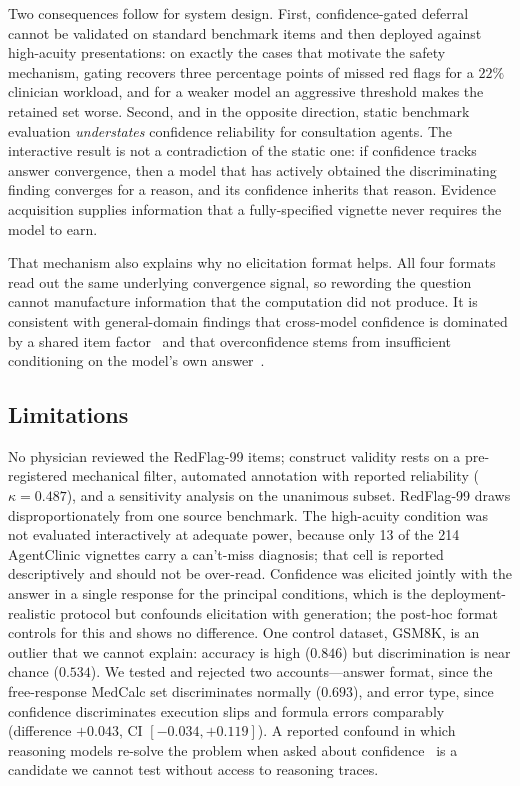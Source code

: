 \documentclass[journal,twoside]{IEEEtran}
\begin{document}
Two consequences follow for system design. First, confidence-gated deferral cannot be validated on
standard benchmark items and then deployed against high-acuity presentations: on exactly the cases
that motivate the safety mechanism, gating recovers three percentage points of missed red flags for
a $22\%$ clinician workload, and for a weaker model an aggressive threshold makes the retained set
worse. Second, and in the opposite direction, static benchmark evaluation \emph{understates}
confidence reliability for consultation agents. The interactive result is not a contradiction of the
static one: if confidence tracks answer convergence, then a model that has actively obtained the
discriminating finding converges for a reason, and its confidence inherits that reason. Evidence
acquisition supplies information that a fully-specified vignette never requires the model to earn.

That mechanism also explains why no elicitation format helps. All four formats read out the same
underlying convergence signal, so rewording the question cannot manufacture information that the
computation did not produce. It is consistent with general-domain findings that cross-model
confidence is dominated by a shared item factor~\cite{metacog2026} and that overconfidence stems
from insufficient conditioning on the model's own answer~\cite{advice2025}.

\subsection{Limitations}
No physician reviewed the RedFlag-99 items; construct validity rests on a pre-registered mechanical
filter, automated annotation with reported reliability ($\kappa = 0.487$), and a sensitivity analysis
on the unanimous subset. RedFlag-99 draws disproportionately from one source benchmark. The
high-acuity condition was not evaluated interactively at adequate power, because only 13 of the 214
AgentClinic vignettes carry a can't-miss diagnosis; that cell is reported descriptively and should
not be over-read. Confidence was elicited jointly with the answer in a single response for the
principal conditions, which is the deployment-realistic protocol but confounds elicitation with
generation; the post-hoc format controls for this and shows no difference. One control dataset,
GSM8K, is an outlier that we cannot explain: accuracy is high ($0.846$) but discrimination is near
chance ($0.534$). We tested and rejected two accounts---answer format, since the free-response
MedCalc set discriminates normally ($0.693$), and error type, since confidence discriminates
execution slips and formula errors comparably (difference $+0.043$, CI $[-0.034, +0.119]$). A
reported confound in which reasoning models re-solve the problem when asked about
confidence~\cite{metacog2026} is a candidate we cannot test without access to reasoning traces.
\end{document}
